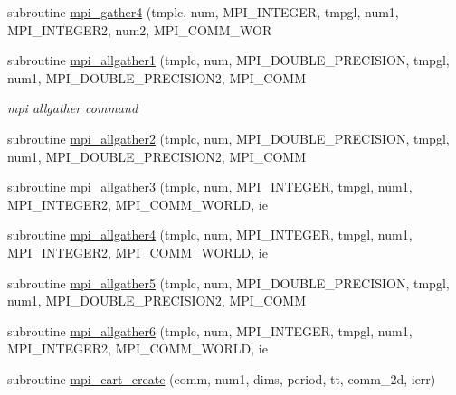 \begin{DoxyCompactItemize}
\item 
subroutine \mbox{\hyperlink{namespacempistub_a6c7b2f5337f97885b72a76ec35729075}{mpi\+\_\+gather4}} (tmplc, num, M\+P\+I\+\_\+\+I\+N\+T\+E\+G\+ER, tmpgl, num1, M\+P\+I\+\_\+\+I\+N\+T\+E\+G\+E\+R2, num2, M\+P\+I\+\_\+\+C\+O\+M\+M\+\_\+\+W\+OR
\item 
subroutine \mbox{\hyperlink{namespacempistub_a61c97c834a766b0372d758a4158ae7da}{mpi\+\_\+allgather1}} (tmplc, num, M\+P\+I\+\_\+\+D\+O\+U\+B\+L\+E\+\_\+\+P\+R\+E\+C\+I\+S\+I\+ON, tmpgl, num1, M\+P\+I\+\_\+\+D\+O\+U\+B\+L\+E\+\_\+\+P\+R\+E\+C\+I\+S\+I\+O\+N2, M\+P\+I\+\_\+\+C\+O\+MM
\begin{DoxyCompactList}\small\item\em mpi allgather command \end{DoxyCompactList}\item 
subroutine \mbox{\hyperlink{namespacempistub_a4af9ae68605228fa295ff15192cad31c}{mpi\+\_\+allgather2}} (tmplc, num, M\+P\+I\+\_\+\+D\+O\+U\+B\+L\+E\+\_\+\+P\+R\+E\+C\+I\+S\+I\+ON, tmpgl, num1, M\+P\+I\+\_\+\+D\+O\+U\+B\+L\+E\+\_\+\+P\+R\+E\+C\+I\+S\+I\+O\+N2, M\+P\+I\+\_\+\+C\+O\+MM
\item 
subroutine \mbox{\hyperlink{namespacempistub_a60f773685d2ab6f25d3d674acd53d941}{mpi\+\_\+allgather3}} (tmplc, num, M\+P\+I\+\_\+\+I\+N\+T\+E\+G\+ER, tmpgl, num1, M\+P\+I\+\_\+\+I\+N\+T\+E\+G\+E\+R2, M\+P\+I\+\_\+\+C\+O\+M\+M\+\_\+\+W\+O\+R\+LD, ie
\item 
subroutine \mbox{\hyperlink{namespacempistub_a2b8f9c4bef9676116ba1eeb6b4e72af5}{mpi\+\_\+allgather4}} (tmplc, num, M\+P\+I\+\_\+\+I\+N\+T\+E\+G\+ER, tmpgl, num1, M\+P\+I\+\_\+\+I\+N\+T\+E\+G\+E\+R2, M\+P\+I\+\_\+\+C\+O\+M\+M\+\_\+\+W\+O\+R\+LD, ie
\item 
subroutine \mbox{\hyperlink{namespacempistub_afa6d7737a2157021051c7c4e7c159079}{mpi\+\_\+allgather5}} (tmplc, num, M\+P\+I\+\_\+\+D\+O\+U\+B\+L\+E\+\_\+\+P\+R\+E\+C\+I\+S\+I\+ON, tmpgl, num1, M\+P\+I\+\_\+\+D\+O\+U\+B\+L\+E\+\_\+\+P\+R\+E\+C\+I\+S\+I\+O\+N2, M\+P\+I\+\_\+\+C\+O\+MM
\item 
subroutine \mbox{\hyperlink{namespacempistub_ace33f6f5c0cff4120ef8d624a20adf59}{mpi\+\_\+allgather6}} (tmplc, num, M\+P\+I\+\_\+\+I\+N\+T\+E\+G\+ER, tmpgl, num1, M\+P\+I\+\_\+\+I\+N\+T\+E\+G\+E\+R2, M\+P\+I\+\_\+\+C\+O\+M\+M\+\_\+\+W\+O\+R\+LD, ie
\item 
subroutine \mbox{\hyperlink{namespacempistub_ae0b8402fe840a321a5e4eabbda8ecb43}{mpi\+\_\+cart\+\_\+create}} (comm, num1, dims, period, tt, comm\+\_\+2d, ierr)
\item 

\end{DoxyCompactItemize}
